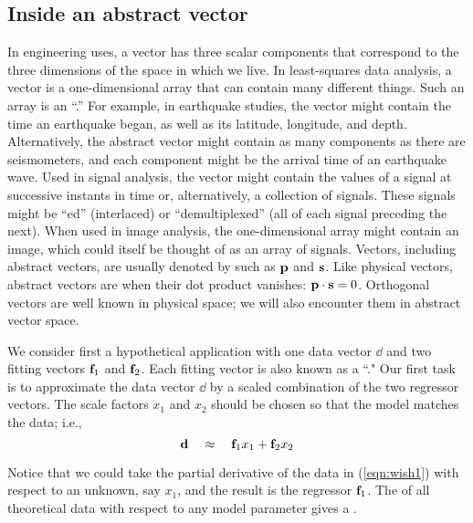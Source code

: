 \subsection{Inside an abstract vector}
In engineering uses,
a vector has three scalar components that
correspond to the three dimensions of the space in which we live.
In least-squares data analysis, a vector is a one-dimensional array
that can contain many different things.
Such an array is an ``.''
For example, in earthquake studies,
the vector might contain the time
an earthquake began, as well as its latitude, longitude, and depth.
Alternatively, the abstract vector
might contain as many components as there are seismometers,
and each component might be the arrival time of an earthquake wave.
Used in signal analysis,
the vector might contain the values of a signal
at successive instants in time or,
alternatively, a collection of signals.
These signals might be ``ed'' (interlaced)
or ``demultiplexed'' (all of each signal preceding the next).
When used in image analysis,
the one-dimensional array might contain an image,
which could itself be thought of as an array of signals.
Vectors, including abstract vectors,
are usually denoted by  such as $\bold p$ and $\bold s$.
Like physical vectors,
abstract vectors are 
when their dot product vanishes: $\bold p \cdot \bold s =0$.
Orthogonal vectors are well known in physical space;
we will also encounter them in abstract vector space.

\par
We consider first a hypothetical application
with one data vector $\dd$ and two
fitting vectors $\bold f_1$ and $\bold f_2$.
Each fitting vector is also known as a ``."
Our first task is to approximate the data vector $\dd$
by a scaled combination of the two regressor vectors.
The scale factors $x_1$ and $x_2$
should be chosen so that the model matches the data; i.e.,
\begin{equation}
        {\bf d}  \quad \approx \quad \bold f_1 x_1 + \bold f_2 x_2
        \label{eqn:wish1}
\end{equation}
\par
Notice that we could take the partial derivative
of the data in (\ref{eqn:wish1}) with respect to an unknown,
say $x_1$,
and the result is the regressor $\bold f_1$.
The  of all theoretical data
with respect to any model parameter
gives a .
\par
{}


